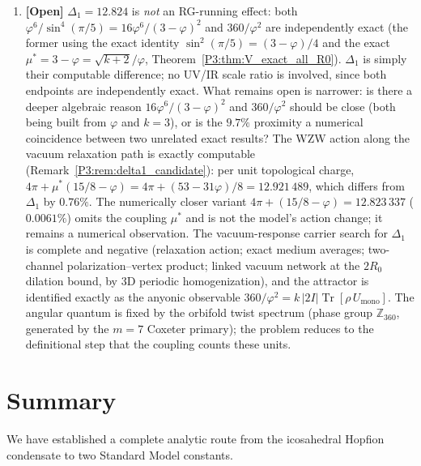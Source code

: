 \documentclass[11pt,a4paper]{article}
\theoremstyle{definition}
\theoremstyle{remark}
\newcommand{\vp}{\varphi}
\begin{document}
\begin{enumerate}[noitemsep]
  \item \textbf{[Open]}
    $\Delta_1=12.824$ is \emph{not} an RG-running effect: both
    $\vp^6/\sin^4(\pi/5)=16\vp^6/(3-\vp)^2$ and $360/\vp^2$ are
    independently exact (the former using the exact identity
    $\sin^2(\pi/5)=(3-\vp)/4$ and the exact $\mu^*=3-\vp=\sqrt{k+2}/\vp$,
    Theorem~\ref{P3:thm:V_exact_all_R0}). $\Delta_1$ is simply their
    computable difference; no UV/IR scale ratio is involved, since both
    endpoints are independently exact. What remains open is narrower:
    is there a deeper algebraic reason
    $16\vp^6/(3-\vp)^2$ and $360/\vp^2$ should be close (both being
    built from $\vp$ and $k=3$), or is the $9.7\%$ proximity a numerical
    coincidence between two unrelated exact results?
    The WZW action along the vacuum relaxation path is exactly
    computable (Remark~\ref{P3:rem:delta1_candidate}): per unit
    topological charge, $4\pi + \mu^*(15/8-\vp) = 4\pi + (53-31\vp)/8
    = 12.921\,489$, which differs from $\Delta_1$ by $0.76\%$. The
    numerically closer variant $4\pi+(15/8-\vp) = 12.823\,337$
    ($0.0061\%$) omits the coupling $\mu^*$ and is not the model's
    action change; it remains a numerical observation. The vacuum-response carrier search for $\Delta_1$ is complete
    and negative (relaxation action; exact medium averages; two-channel
    polarization--vertex product; linked vacuum network at the $2R_0$
    dilation bound, by 3D periodic homogenization), and the attractor
    is identified exactly as the anyonic observable $360/\vp^2 =
    k\,|2I|\operatorname{Tr}[\rho\,U_{\mathrm{mono}}]$. The angular
    quantum is fixed by the orbifold twist spectrum (phase group
    $\mathbb{Z}_{360}$, generated by the $m=7$ Coxeter primary); the
    problem reduces to the definitional step that the coupling counts
    these units.

\end{enumerate}

\section{Summary}
\label{P3:sec:summary}

We have established a complete analytic route from the icosahedral
Hopfion condensate to two Standard Model constants.
\end{document}
